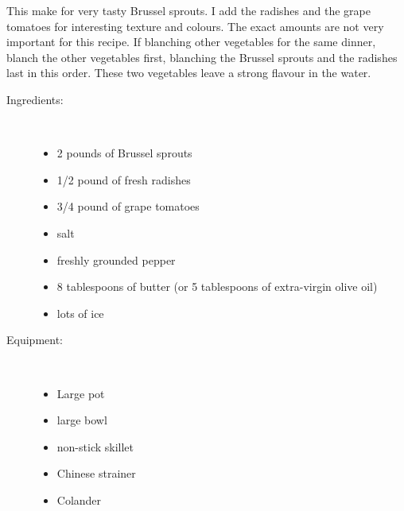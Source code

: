 \documentclass[11pt,letterpaper]{article}
\begin{document}


This make for very tasty Brussel sprouts. I add the radishes and the grape tomatoes for interesting texture and colours. The exact amounts are not very important for this recipe. If blanching other vegetables for the same dinner, blanch the other vegetables first, blanching the Brussel sprouts and the radishes last in this order. These two vegetables leave a strong flavour in the water.
\begin{description}

\item[Ingredients:]\ \\
	\begin{itemize}
	\item 2 pounds of Brussel sprouts
	\item 1/2 pound of fresh radishes 
	\item 3/4 pound of grape tomatoes
	\item salt
	\item freshly grounded pepper
	\item 8 tablespoons of butter (or 5 tablespoons of extra-virgin olive oil)
	\item lots of ice
	\end{itemize}

\item[Equipment:]\ \\
	\begin{itemize}
	\item Large pot
	\item large bowl
	\item non-stick skillet
	\item Chinese strainer
	\item Colander
	\end{itemize}


\end{description}
\end{document}
